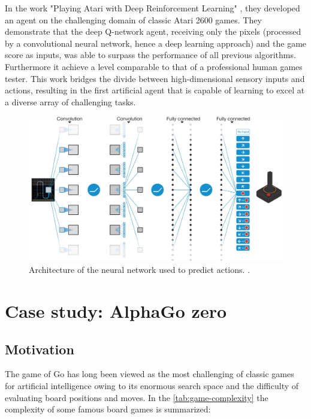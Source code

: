 \documentclass{article}
\begin{document}
In the work "Playing Atari with Deep Reinforcement Learning" \cite{mnih2013atari}, they developed an agent on the challenging domain of classic Atari 2600 games. They demonstrate that the deep Q-network agent, receiving only the pixels (processed by a convolutional neural network, hence a deep learning approach) and the game score as inputs, was able to surpass the performance of all previous algorithms. Furthermore it achieve a level comparable to that of a professional human games tester. This work bridges the divide between high-dimensional sensory inputs and actions, resulting in the first artificial agent that is capable of learning to excel at a diverse array of challenging tasks.

\begin{figure}[h]
	\centering
	\includegraphics[width=14cm]{dqn-architecture.png}
	\caption{Architecture of the neural network used to predict actions. \cite{mnih2013atari}.}
	\label{fig:dqn-architecture.png}
\end{figure}



\section{Case study: AlphaGo zero}
\subsection{Motivation}
The game of Go has long been viewed as the most challenging of classic games for artificial intelligence owing to its enormous search space and the difficulty of evaluating board positions and moves. In the \autoref{tab:game-complexity} the complexity of some famous board games is summarized:
\end{document}
